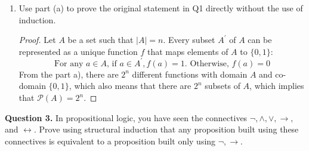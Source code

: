 \documentclass[11pt]{article}
\begin{document}
\begin{enumerate}[label=\alph*)]
\begin{proof}
            By the principle of simple induction, \(P(m)\) is true for all positive naturals \(m\).

            

        \end{proof}
        \pagebreak
        \item Use part (a) to prove the original statement in Q1 directly without the use of induction.
        \begin{proof}
            Let \(A\) be a set such that \(|A| = n\). Every subset \(A^\prime\) of \(A\) can be represented as a unique function \(f\) that maps elements of \(A\) to \(\{0,1\}\):
            \[
                \text{For any } a \in A \text{, if } a \in A^\prime, f(a) = 1 \text{. Otherwise, } f(a) = 0
            \]
            From the part a), there are \(2^n\) different functions with domain \(A\) and co-domain \(\{0,1\}\), which also means that there are \(2^n\) subsets of \(A\), which implies that \(\mathcal{P} (A)=2^n\).

        \end{proof}
    \end{enumerate}
    \pagebreak
    \noindent\textbf{Question 3.} In propositional logic, you have seen the connectives $\neg, \wedge, \vee, \rightarrow, $ and $\leftrightarrow$. Prove using structural induction that any proposition built using these connectives is equivalent to a proposition built only using $\neg, \rightarrow$.
\end{document}
